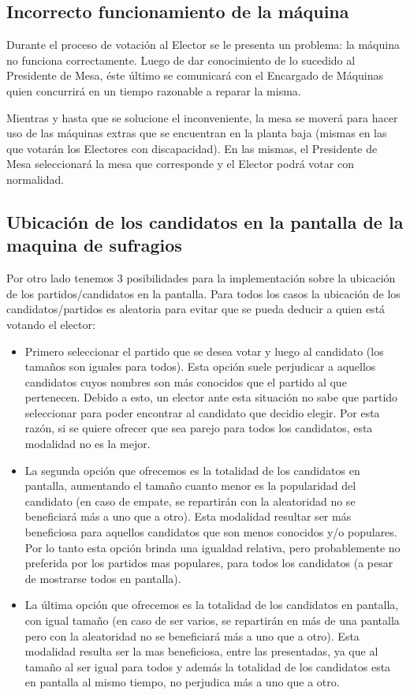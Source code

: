 \documentclass[spanish, 10pt,a4paper]{article}
\numberwithin{equation}{section} %
\begin{document}
\subsection{Incorrecto funcionamiento de la máquina}
	Durante el proceso de votación al Elector se le presenta un problema: la máquina no funciona correctamente. Luego de dar conocimiento de lo sucedido al Presidente de Mesa, éste último se comunicará con el Encargado de Máquinas quien concurrirá en un tiempo razonable a reparar la misma. 
	
	Mientras y hasta que se solucione el inconveniente, la mesa se moverá para hacer uso de las máquinas extras que se encuentran en la planta baja  (mismas en las que votarán los Electores con discapacidad). En las mismas,  el Presidente de Mesa seleccionará la mesa que corresponde y el Elector podrá votar con normalidad.

\subsection{Ubicación de los candidatos en la pantalla de la maquina de sufragios}
Por otro lado tenemos 3 posibilidades para la implementación sobre la ubicación de los partidos/candidatos en la pantalla. Para todos los casos la ubicación de los candidatos/partidos es aleatoria para evitar que se pueda deducir a quien está votando el elector:

\begin{itemize}

\item Primero seleccionar el partido que se desea votar y luego al candidato (los tamaños son iguales para todos). Esta opción suele perjudicar a aquellos candidatos cuyos nombres son más conocidos que el partido al que pertenecen. Debido a esto, un elector ante esta situación no sabe que partido seleccionar para poder encontrar al candidato que decidio elegir. Por esta razón, si se quiere ofrecer que sea parejo para todos los candidatos, esta modalidad no es la mejor.

\item La segunda opción que ofrecemos es la totalidad de los candidatos en pantalla, aumentando el tamaño cuanto menor es la popularidad del candidato (en caso de empate, se repartirán con la aleatoridad no se beneficiará más a uno que a otro). Esta modalidad resultar ser más beneficiosa para aquellos candidatos que son menos conocidos y/o populares. Por lo tanto esta opción  brinda una igualdad relativa, pero probablemente no preferida por los partidos mas populares, para todos los candidatos (a pesar de mostrarse todos en pantalla).

\item La última opción que ofrecemos es la totalidad de los candidatos en pantalla, con igual tamaño (en caso de ser varios, se repartirán en más de una pantalla pero con la aleatoridad no se beneficiará más a uno que a otro). Esta modalidad resulta ser la mas beneficiosa, entre las presentadas, ya que al tamaño al ser igual para todos y además la totalidad de los candidatos esta en pantalla al mismo tiempo, no perjudica más a uno que a otro.

\end{itemize}
\end{document}
